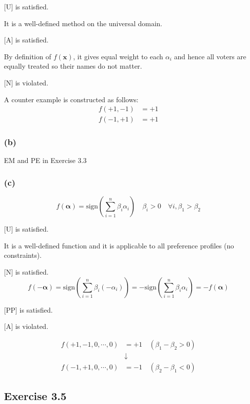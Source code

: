 \documentclass[a4paper]{article}
\begin{document}
[U] is satisfied.

It is a well-defined method on the universal domain.

[A] is satisfied.

By definition of $f(\boldsymbol{x})$, it gives equal weight to each $\alpha_i$ and hence all voters are equally treated so their names do not matter.

[N] is violated.

A counter example is constructed as follows:
\begin{align*}
    f(+1, -1) &= +1 \\
    f(-1, +1) &= +1
\end{align*}

\subsubsection*{(b)}

EM and PE in Exercise 3.3

\subsubsection*{(c)}

\begin{equation*}
    f(\boldsymbol{\alpha})=\text{sign}\left(\sum_{i=1}^{n}\beta_i\alpha_i \right)
    \quad \beta_i>0\quad\forall i, \beta_1>\beta_2
\end{equation*}

[U] is satisfied. 

It is a well-defined function and it is applicable to all preference profiles (no constraints).

[N] is satisfied.
\begin{equation*}
    f(-\boldsymbol{\alpha})=\text{sign}\left(\sum_{i=1}^{n}\beta_i(-\alpha_i) \right)=
    -\text{sign}\left(\sum_{i=1}^{n}\beta_i\alpha_i \right)=-f(\boldsymbol{\alpha})
\end{equation*}

[PP] is satisfied.

[A] is violated.

\begin{align*}
    f(+1, -1, 0, \cdots, 0) &= +1 \quad (\beta_1-\beta_2>0) \\
                            &\downarrow \\
    f(-1, +1, 0, \cdots, 0) &= -1 \quad (\beta_2-\beta_1<0)
\end{align*}


\subsection*{Exercise 3.5}
\end{document}
